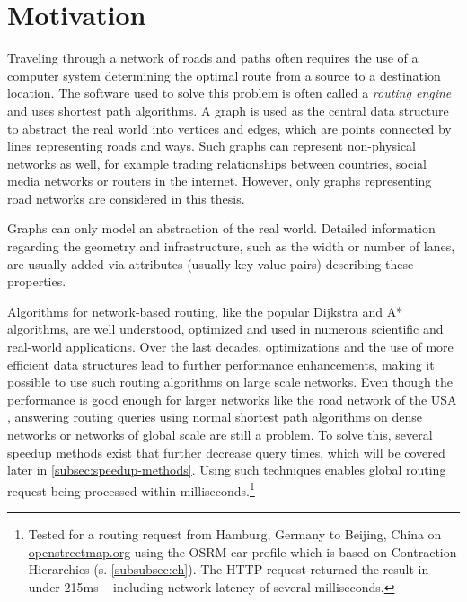 
\section{Motivation}
	
	Traveling through a network of roads and paths often requires the use of a computer system determining the optimal route from a source to a destination location.
	The software used to solve this problem is often called a \emph{routing engine} and uses shortest path algorithms.
	A graph is used as the central data structure to abstract the real world into vertices and edges, which are points connected by lines representing roads and ways.
	Such graphs can represent non-physical networks as well, for example trading relationships between countries, social media networks or routers in the internet.
	However, only graphs representing road networks are considered in this thesis.
	
	Graphs can only model an abstraction of the real world.
	Detailed information regarding the geometry and infrastructure, such as the width or number of lanes, are usually added via attributes (usually key-value pairs) describing these properties.
	
	Algorithms for network-based routing, like the popular Dijkstra and A* algorithms, are well understood, optimized and used in numerous scientific and real-world applications.
	Over the last decades, optimizations and the use of more efficient data structures lead to further performance enhancements, making it possible to use such routing algorithms on large scale networks.
	Even though the performance is good enough for larger networks like the road network of the USA \cite{aviram-optimizing-dijkstra}, answering routing queries using normal shortest path algorithms on dense networks or networks of global scale are still a problem.
	To solve this, several speedup methods exist that further decrease query times, which will be covered later in \cref{subsec:speedup-methods}.
	Using such techniques enables global routing request being processed within milliseconds.\footnote{Tested for a routing request from Hamburg, Germany to Beijing, China on \href{https://www.openstreetmap.org/directions?engine=fossgis\_osrm\_car&route=53.55\%2C10.00\%3B39.91\%2C116.39}{openstreetmap.org} using the OSRM car profile which is based on Contraction Hierarchies (s. \cref{subsubsec:ch}). The HTTP request returned the result in under 215ms -- including network latency of several milliseconds.}
	
